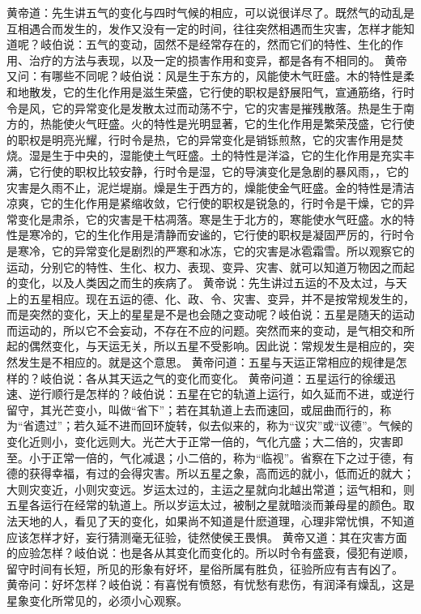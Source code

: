 \documentclass[12pt,UTF8]{ctexbook}
\begin{document}
黄帝道：先生讲五气的变化与四时气候的相应，可以说很详尽了。既然气的动乱是互相遇合而发生的，发作又没有一定的时间，往往突然相遇而生灾害，怎样才能知道呢？岐伯说：五气的变动，固然不是经常存在的，然而它们的特性、生化的作用、治疗的方法与表现，以及一定的损害作用和变异，都是各有不相同的。
黄帝又问：有哪些不同呢？岐伯说：风是生于东方的，风能使木气旺盛。木的特性是柔和地散发，它的生化作用是滋生荣盛，它行使的职权是舒展阳气，宣通筋络，行时令是风，它的异常变化是发散太过而动荡不宁，它的灾害是摧残散落。热是生于南方的，热能使火气旺盛。火的特性是光明显著，它的生化作用是繁荣茂盛，它行使的职权是明亮光耀，行时令是热，它的异常变化是销铄煎熬，它的灾害作用是焚烧。湿是生于中央的，湿能使土气旺盛。土的特性是洋溢，它的生化作用是充实丰满，它行使的职权比较安静，行时令是湿，它的导演变化是急剧的暴风雨，，它的灾害是久雨不止，泥烂堤崩。燥是生于西方的，燥能使金气旺盛。金的特性是清洁凉爽，它的生化作用是紧缩收敛，它行使的职权是锐急的，行时令是干燥，它的异常变化是肃杀，它的灾害是干枯凋落。寒是生于北方的，寒能使水气旺盛。水的特性是寒冷的，它的生化作用是清静而安谧的，它行使的职权是凝固严厉的，行时令是寒冷，它的异常变化是剧烈的严寒和冰冻，它的灾害是冰雹霜雪。所以观察它的运动，分别它的特性、生化、权力、表现、变异、灾害、就可以知道万物因之而起的变化，以及人类因之而生的疾病了。
黄帝说：先生讲过五运的不及太过，与天上的五星相应。现在五运的德、化、政、令、灾害、变异，并不是按常规发生的，而是突然的变化，天上的星星是不是也会随之变动呢？岐伯说：五星是随天的运动而运动的，所以它不会妄动，不存在不应的问题。突然而来的变动，是气相交和所起的偶然变化，与天运无关，所以五星不受影响。因此说：常规发生是相应的，突然发生是不相应的。就是这个意思。
黄帝问道：五星与天运正常相应的规律是怎样的？岐伯说：各从其天运之气的变化而变化。
黄帝问道：五星运行的徐缓迅速、逆行顺行是怎样的？岐伯说：五星在它的轨道上运行，如久延而不进，或逆行留守，其光芒变小，叫做“省下”；若在其轨道上去而速回，或屈曲而行的，称为“省遗过”；若久延不进而回环旋转，似去似来的，称为“议灾”或“议德”。气候的变化近则小，变化远则大。光芒大于正常一倍的，气化亢盛；大二倍的，灾害即至。小于正常一倍的，气化减退；小二倍的，称为“临视”。省察在下之过于德，有德的获得幸福，有过的会得灾害。所以五星之象，高而远的就小，低而近的就大；大则灾变近，小则灾变远。岁运太过的，主运之星就向北越出常道；运气相和，则五星各运行在经常的轨道上。所以岁运太过，被制之星就暗淡而兼母星的颜色。取法天地的人，看见了天的变化，如果尚不知道是什麽道理，心理非常忧惧，不知道应该怎样才好，妄行猜测毫无征验，徒然使侯王畏惧。
黄帝又道：其在灾害方面的应验怎样？岐伯说：也是各从其变化而变化的。所以时令有盛衰，侵犯有逆顺，留守时间有长短，所见的形象有好坏，星俗所属有胜负，征验所应有吉有凶了。
黄帝问：好坏怎样？岐伯说：有喜悦有愤怒，有忧愁有悲伤，有润泽有燥乱，这是星象变化所常见的，必须小心观察。
\end{document}
